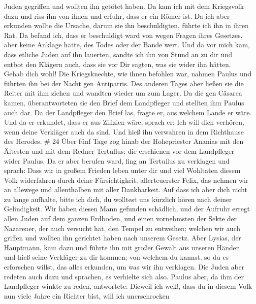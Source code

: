 Juden gegriffen und wollten ihn getötet haben. Da kam ich mit dem
Kriegsvolk dazu und riss ihn von ihnen und erfuhr, dass er ein Römer
ist.  Da ich aber erkunden wollte die Ursache, darum sie
ihn beschuldigten, führte ich ihn in ihren Rat.  Da befand
ich, dass er beschuldigt ward von wegen Fragen ihres Gesetzes, aber
keine Anklage hatte, des Todes oder der Bande wert.  Und da
vor mich kam, dass etliche Juden auf ihn lauerten, sandte ich ihn von
Stund an zu dir und entbot den Klägern auch, dass sie vor Dir sagten,
was sie wider ihn hätten. Gehab dich wohl!  Die
Kriegsknechte, wie ihnen befohlen war, nahmen Paulus und führten ihn bei
der Nacht gen Antipatris.  Des anderen Tages aber ließen
sie die Reiter mit ihm ziehen und wandten wieder um zum Lager.
 Da die gen Cäsarea kamen, überantworteten sie den Brief
dem Landpfleger und stellten ihm Paulus auch dar.  Da der
Landpfleger den Brief las, fragte er, aus welchem Lande er wäre. Und da
er erkundet, dass er aus Zilizien wäre, sprach er:  Ich
will dich verhören, wenn deine Verkläger auch da sind. Und hieß ihn
verwahren in dem Richthause des Herodes. \# 24  Über fünf
Tage zog hinab der Hohepriester Ananias mit den Ältesten und mit dem
Redner Tertullus; die erschienen vor dem Landpfleger wider Paulus.
 Da er aber berufen ward, fing an Tertullus zu verklagen und
sprach:  Dass wir in großem Frieden leben unter dir und viel
Wohltaten diesem Volk widerfahren durch deine Fürsichtigkeit,
allerteuerster Felix, das nehmen wir an allewege und allenthalben mit
aller Dankbarkeit.  Auf dass ich aber dich nicht zu lange
aufhalte, bitte ich dich, du wolltest uns kürzlich hören nach deiner
Gelindigkeit.  Wir haben diesen Mann gefunden schädlich, und
der Aufruhr erregt allen Juden auf dem ganzen Erdboden, und einen
vornehmsten der Sekte der Nazarener,  der auch versucht hat,
den Tempel zu entweihen; welchen wir auch griffen und wollten ihn
gerichtet haben nach unserem Gesetz.  Aber Lysias, der
Hauptmann, kam dazu und führte ihn mit großer Gewalt aus unseren Händen
 und hieß seine Verkläger zu dir kommen; von welchem du
kannst, so du es erforschen willst, das alles erkunden, um was wir ihn
verklagen.  Die Juden aber redeten auch dazu und sprachen,
es verhielte sich also.  Paulus aber, da ihm der
Landpfleger winkte zu reden, antwortete: Dieweil ich weiß, dass du in
diesem Volk nun viele Jahre ein Richter bist, will ich unerschrocken
